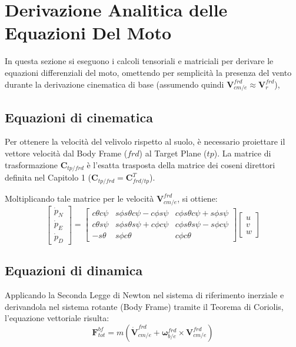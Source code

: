\chapter{Derivazione Analitica delle Equazioni Del Moto}
\label{capi2}
In questa sezione si eseguono i calcoli tensoriali e matriciali per derivare le equazioni differenziali del moto, omettendo per semplicità la presenza del vento durante la derivazione cinematica di base (assumendo quindi $\mathbf{V}_{cm/e}^{frd} \approx \mathbf{V}_r^{frd}$),\cite{lewis2015ch2}

\section{Equazioni di cinematica}
Per ottenere la velocità del velivolo rispetto al suolo, è necessario proiettare il vettore velocità dal Body Frame ($frd$) al Target Plane ($tp$). La matrice di trasformazione $\mathbf{C}_{tp/frd}$ è l'esatta trasposta della matrice dei coseni direttori definita nel Capitolo 1 ($\mathbf{C}_{tp/frd} = \mathbf{C}_{frd/tp}^T$).

Moltiplicando tale matrice per le velocità $\mathbf{V}_{cm/e}^{frd}$, si ottiene:
\begin{equation}
\begin{bmatrix} \dot{p}_N \\ \dot{p}_E \\ \dot{p}_D \end{bmatrix} = 
\begin{bmatrix} 
c\theta c\psi & s\phi s\theta c\psi - c\phi s\psi & c\phi s\theta c\psi + s\phi s\psi \\ 
c\theta s\psi & s\phi s\theta s\psi + c\phi c\psi & c\phi s\theta s\psi - s\phi c\psi \\ 
-s\theta & s\phi c\theta & c\phi c\theta 
\end{bmatrix} 
\begin{bmatrix} u \\ v \\ w \end{bmatrix}
\end{equation}

\section{Equazioni di dinamica}
Applicando la Seconda Legge di Newton nel sistema di riferimento inerziale e derivandola nel sistema rotante (Body Frame) tramite il Teorema di Coriolis, l'equazione vettoriale risulta:
\begin{equation}
\mathbf{F}_{tot}^{bf} = m \left( \dot{\mathbf{V}}_{cm/e}^{frd} + \boldsymbol{\omega}_{b/e}^{frd} \times \mathbf{V}_{cm/e}^{frd} \right)
\end{equation}

